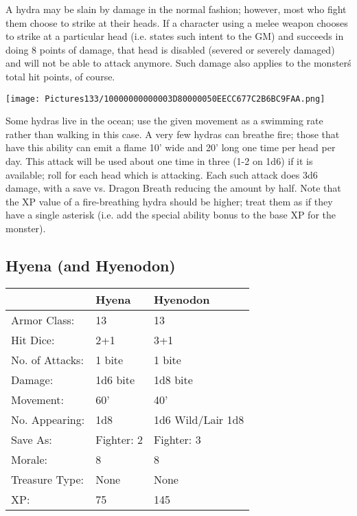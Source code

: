\documentclass[a4paper,twoside,openany,10pt]{book}
\begin{document}
\begin{multicols}{2}
A hydra may be slain by damage in the normal fashion; however, most who fight them choose to strike at their heads. If a character using a melee weapon chooses to strike at a particular head (i.e. states such intent to the GM) and succeeds in doing 8 points of damage, that head is disabled (severed or severely damaged) and will not be able to attack anymore. Such damage also applies to the monster\'s total hit points, of course.

\begin{center}
	\texttt{[image: Pictures133/10000000000003D80000050EECC677C2B6BC9FAA.png]}
\end{center}

Some hydras live in the ocean; use the given movement as a swimming rate rather than walking in this case. A very few hydras can breathe fire; those that have this ability can emit a flame 10' wide and 20' long one time per head per day. This attack will be used about one time in three (1-2 on 1d6) if it is available; roll for each head which is attacking. Each such attack does 3d6 damage, with a save vs. Dragon Breath reducing the amount by half. Note that the XP value of a fire-breathing hydra should be higher; treat them as if they have a single asterisk (i.e. add the special ability bonus to the base XP for the monster).


\subsection*{Hyena (and Hyenodon)}\label{hyena-and-hyenodon}

\begin{tabularx}{0.50\textwidth}{@{}llX@{}}
& Hyena & Hyenodon \\\hline
Armor Class: & 13 & 13 \\\hline
Hit Dice: & 2+1 & 3+1 \\\hline
No. of Attacks: & 1 bite & 1 bite \\\hline
Damage: & 1d6 bite & 1d8 bite \\\hline
Movement: & 60' & 40' \\\hline
No. Appearing: & 1d8 & 1d6 Wild/Lair 1d8 \\\hline
Save As: & Fighter: 2 & Fighter: 3 \\\hline
Morale: & 8 & 8 \\\hline
Treasure Type: & None & None \\\hline
XP: & 75 & 145 \\\hline
\end{tabularx}\medskip


\end{multicols}
\end{document}

